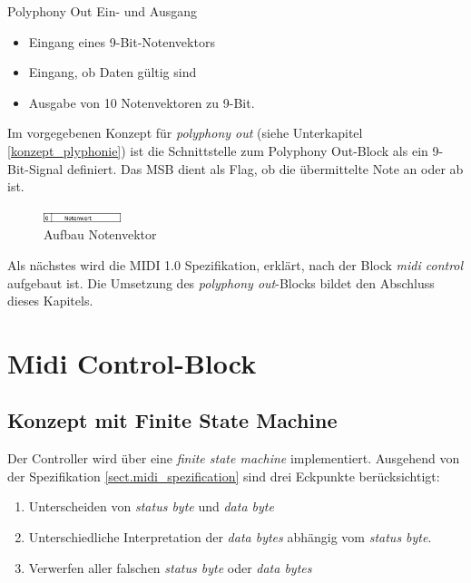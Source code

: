 Polyphony Out Ein- und Ausgang

\begin{itemize}
	\item Eingang eines 9-Bit-Notenvektors
    \item Eingang, ob Daten gültig sind
	\item Ausgabe von 10 Notenvektoren zu 9-Bit.
\end{itemize}
\bigskip

Im vorgegebenen Konzept für \textit{polyphony out} (siehe Unterkapitel \ref{konzept_plyphonie}) ist die Schnittstelle zum Polyphony Out-Block als ein 9-Bit-Signal definiert. Das MSB dient als Flag, ob die übermittelte Note an oder ab ist.

\begin{figure}[H]
	\includegraphics[width=0.2\textwidth]{images/midi_interface/NotenVektor.png}
	\caption{Aufbau Notenvektor}
	\label{fig.Notenvektor}
\end{figure}

Als nächstes wird die MIDI 1.0 Spezifikation, erklärt, nach der Block \textit{midi control} aufgebaut ist. Die Umsetzung des \textit{polyphony out}-Blocks bildet den Abschluss dieses Kapitels.




\newpage
\section{Midi Control-Block}\label{sect.midi_umsetzung}

\subsection{Konzept mit Finite State Machine}\label{anforderung_fsm}

Der Controller wird über eine \textit{finite state machine} implementiert. Ausgehend von der Spezifikation \ref{sect.midi_spezification} sind drei Eckpunkte berücksichtigt:

\begin{enumerate}
	\item Unterscheiden von \textit{status byte} und \textit{data byte}
	\item Unterschiedliche Interpretation der \textit{data bytes} abhängig vom \textit{status byte}.
	\item Verwerfen aller falschen \textit{status byte} oder \textit{data bytes}
\end{enumerate}

